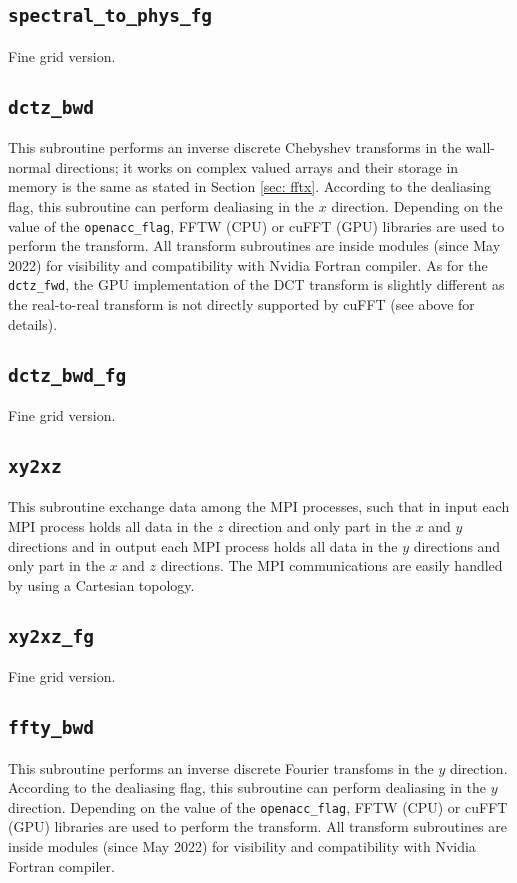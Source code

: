 \subsection{\texttt{spectral\_to\_phys\_fg}}
Fine grid version.

\subsection{\texttt{dctz\_bwd}}
This subroutine performs an inverse discrete Chebyshev transforms in the wall-normal directions; it works on complex valued arrays and their storage in memory is the same as stated in Section \ref{sec: fftx}. According to the dealiasing flag, this subroutine can perform dealiasing in the $x$ direction.
Depending on the value of the \texttt{openacc\_flag}, FFTW (CPU) or cuFFT (GPU) libraries are used to perform the transform.
All transform subroutines are inside modules (since May 2022) for visibility and compatibility with Nvidia Fortran compiler.
As for the \texttt{dctz\_fwd}, the GPU implementation of the DCT transform is slightly different as the real-to-real transform is not directly supported by cuFFT (see above for details).

\subsection{\texttt{dctz\_bwd\_fg}}
Fine grid version.


\subsection{\texttt{xy2xz}}
This subroutine exchange data among the MPI processes, such that in input each MPI process holds all data in the $z$ direction and only part in the $x$ and $y$ directions and in output each MPI process holds all data in the $y$ directions and only part in the $x$ and $z$ directions. The MPI communications are easily handled by using a Cartesian topology.

\subsection{\texttt{xy2xz\_fg}}
Fine grid version.

\subsection{\texttt{ffty\_bwd}}
This subroutine performs an inverse discrete Fourier transfoms in the $y$ direction. According to the dealiasing flag, this subroutine can perform dealiasing in the $y$ direction.
Depending on the value of the \texttt{openacc\_flag}, FFTW (CPU) or cuFFT (GPU) libraries are used to perform the transform.
All transform subroutines are inside modules (since May 2022) for visibility and compatibility with Nvidia Fortran compiler.

